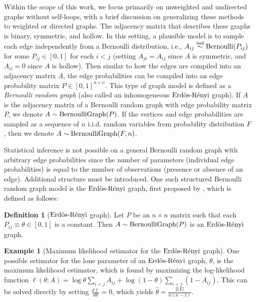 \documentclass[
  12pt,
]{article}
\theoremstyle{definition}
\newtheorem{definition}{Definition}[section]
\theoremstyle{definition}
\newtheorem{example}{Example}[section]
\theoremstyle{definition}
\theoremstyle{definition}
\theoremstyle{remark}
\begin{document}
Within the scope of this work, we focus primarily on unweighted and undirected graphs without self-loops, with a brief discussion on generalizing these methods to weighted or directed graphs.
The adjacency matrix that describes these graphs is binary, symmetric, and hollow.
In this setting, a plausible model is to sample each edge independently from a Bernoulli distribution, i.e., \(A_{ij} \stackrel{\mathrm{ind}}{\sim} \mathrm{Bernoulli}(P_{ij})\) for some \(P_{ij} \in [0, 1]\) for each \(i < j\) (setting \(A_{ji} = A_{ij}\) since \(A\) is symmetric, and \(A_{ii} = 0\) since \(A\) is hollow).
Then similar to how the edges are compiled into an adjacency matrix \(A\), the edge probabilities can be compiled into an edge probability matrix \(P \in [0, 1]^{n \times n}\).
This type of graph model is defined as a \emph{Bernoulli random graph} (also called an inhomogeneous \(\text{Erd\"{o}s-R\'{e}nyi}\) graph).
If \(A\) is the adjacency matrix of a Bernoulli random graph with edge probability matrix \(P\), we denote \(A \sim \mathrm{BernoulliGraph}(P)\).
If the vertices and edge probabilities are sampled as a sequence of \(n\) i.i.d. random variables from probability distribution \(F\), then we denote \(A \sim \mathrm{BernoulliGraph}(F, n)\).

Statistical inference is not possible on a general Bernoulli random graph with arbitrary edge probabilities since the number of parameters (individual edge probabilities) is equal to the number of observations (presence or absence of an edge).
Additional structure must be introduced.
One such structured Bernoulli random graph model is the \(\text{Erd\"{o}s-R\'{e}nyi}\) graph, first proposed by \cite{Gilbert:1959}, which is defined as follows:

\begin{definition}[$\text{Erd\"{o}s-R\'{e}nyi}$ graph]
\label{def:erdos-renyi}
Let $P$ be an $n \times n$ matrix such that each $P_{ij} \equiv \theta \in [0, 1]$ is a constant. 
Then $A \sim \mathrm{BernoulliGraph}(P)$ is an $\text{Erd\"{o}s-R\'{e}nyi}$ graph. 
\end{definition}

\begin{example}[Maximum likelihood estimator for the $\text{Erd\"{o}s-R\'{e}nyi}$ graph]
One possible estimator for the lone parameter of an $\text{Erd\"{o}s-R\'{e}nyi}$ graph, $\theta$, is the maximum likelihood estimator, which is found by maximizing the log-likelihood function $\ell(\theta; A) = \log \theta \sum\limits_{i < j} A_{ij} + \log (1 - \theta) \sum\limits_{i < j} (1 - A_{ij})$. 
This can be solved directly by setting $\frac{d \ell}{d \theta} = 0$, which yields $\hat{\theta} = \frac{2 |E|}{n (n-1)}$.
\end{example}
\end{document}

